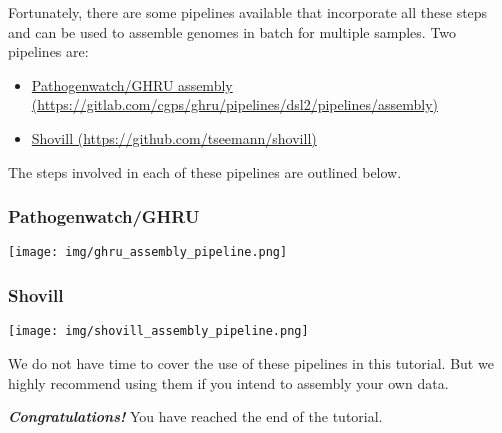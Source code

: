 \documentclass[11pt]{article}
\providecommand{\tightlist}{%
      \setlength{\itemsep}{0pt}\setlength{\parskip}{0pt}}
\begin{document}
    Fortunately, there are some pipelines available that incorporate all
these steps and can be used to assemble genomes in batch for multiple
samples. Two pipelines are:

\begin{itemize}
\tightlist
\item
  \href{https://gitlab.com/cgps/ghru/pipelines/dsl2/pipelines/assembly}{Pathogenwatch/GHRU
  assembly
  (https://gitlab.com/cgps/ghru/pipelines/dsl2/pipelines/assembly)}
\item
  \href{https://github.com/tseemann/shovill}{Shovill
  (https://github.com/tseemann/shovill)}
\end{itemize}

The steps involved in each of these pipelines are outlined below.

    \hypertarget{pathogenwatchghru}{%
\subsubsection{Pathogenwatch/GHRU}\label{pathogenwatchghru}}


\begin{center}
\texttt{[image: img/ghru\_assembly\_pipeline.png]}
\end{center}


    \hypertarget{shovill}{%
\subsubsection{Shovill}\label{shovill}}


\begin{center}
\texttt{[image: img/shovill\_assembly\_pipeline.png]}
\end{center}


    We do not have time to cover the use of these pipelines in this
tutorial. But we highly recommend using them if you intend to assembly
your own data.

    \textbf{\textit{Congratulations!}} You have reached the end of the
tutorial.


\end{document}
